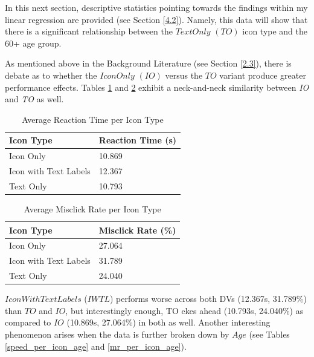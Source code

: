\documentclass[12pt,twoside]{reedthesis}
\begin{document}
    In this next section, descriptive statistics pointing towards the findings within my linear regression are provided (see Section \ref{4.2}). Namely, this data will show that there is a significant relationship between the $TextOnly$ $(TO)$ icon type and the 60+ age group.

    As mentioned above in the Background Literature (see Section \ref{2.3}), there is debate as to whether the $IconOnly$ $(IO)$ versus the $TO$ variant produce greater performance effects. Tables \ref{speed_per_icon} and \ref{mr_per_icon} exhibit a neck-and-neck similarity between \textit{IO} and \textit{TO} as well.

    \begin{table}[h!]
        \centering
        \begin{tabular}{| p{5cm} | p{3.5cm} |}
            \hline
            Icon Type & Reaction Time (s)\\
            \hline
            Icon Only & 10.869\\
            \hline
            Icon with Text Labels & 12.367\\
            \hline
            Text Only & 10.793\\
            \hline
        \end{tabular}
        \caption{Average Reaction Time per Icon Type}
        \label{speed_per_icon}
    \end{table}

    \begin{table}[h!]
        \centering
        \begin{tabular}{| p{5cm} | p{3.5cm} |}
            \hline
            Icon Type & Misclick Rate (\%)\\
            \hline
            Icon Only & 27.064\\
            \hline
            Icon with Text Labels & 31.789\\
            \hline
            Text Only & 24.040\\
            \hline
        \end{tabular}
        \caption{Average Misclick Rate per Icon Type}
        \label{mr_per_icon}
    \end{table}

    $IconWithTextLabels$ ($IWTL$) performs worse across both DVs (12.367s, 31.789\%) than $TO$ and $IO$, but interestingly enough, TO ekes ahead (10.793s, 24.040\%) as compared to $IO$ (10.869s, 27.064\%) in both as well. Another interesting phenomenon arises when the data is further broken down by $Age$ (see Tables \ref{speed_per_icon_age} and \ref{mr_per_icon_age}).
\end{document}
